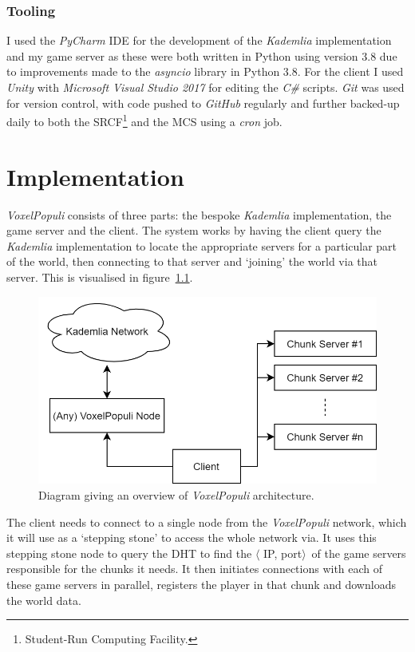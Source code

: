 \documentclass[12pt,notitlepage,a4paper]{report}
\newcommand{\unity}{\emph{Unity}}
\newcommand{\kademlia}{\emph{Kademlia}}
\newcommand{\voxpop}{\emph{VoxelPopuli}}
\begin{document}
	\subsection{Tooling}
	I used the \emph{PyCharm} IDE for the development of the \kademlia{} implementation and my game server as these were both written in Python using version $3.8$ due to improvements made to the \emph{asyncio} library in Python $3.8$. For the client I used \unity{} with \emph{Microsoft Visual Studio 2017} for editing the \emph{C\#} scripts. \emph{Git} was used for version control, with code pushed to \emph{GitHub} regularly and further backed-up daily to both the SRCF\footnote{Student-Run Computing Facility.} and the MCS using a \emph{cron} job.
	
	\clearpage
	\chapter{Implementation}
	\voxpop{} consists of three parts: the bespoke \kademlia{} implementation, the game server and the client. The system works by having the client query the \kademlia{} implementation to locate the appropriate servers for a particular part of the world, then connecting to that server and `joining' the world via that server. This is visualised in figure~\ref{fig:diagram1}.
	
	\begin{figure}[!ht]
		\includegraphics[width=\textwidth]{diag1.png}
		\caption{Diagram giving an overview of \voxpop{} architecture.}
		\label{fig:diagram1}
	\end{figure}
	The client needs to connect to a single node from the \voxpop{} network, which it will use as a `stepping stone' to access the whole network via. It uses this stepping stone node to query the DHT to find the $\langle$ IP, port$\rangle$~of the game servers responsible for the chunks it needs. It then initiates connections with each of these game servers in parallel, registers the player in that chunk and downloads the world data.
	
\end{document}
